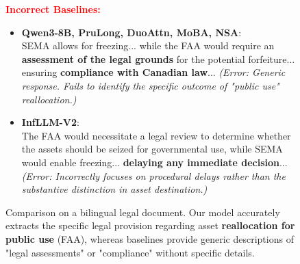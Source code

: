 \begin{figure}[ht]
\begin{AcademicBox}
\textbf{\textcolor{red}{Incorrect Baselines:}} \\
\footnotesize
\begin{itemize}[leftmargin=*, label={}, itemsep=4pt, topsep=2pt]

    \item \textbf{Qwen3-8B, PruLong, DuoAttn, MoBA, NSA}: \\
    SEMA allows for freezing... while the FAA would require an \textbf{assessment of the legal grounds} for the potential forfeiture... ensuring \textbf{compliance with Canadian law}...
    \textit{(Error: Generic response. Fails to identify the specific outcome of "public use" reallocation.)}

    \item \textbf{InfLLM-V2}: \\
    The FAA would necessitate a legal review to determine whether the assets should be seized for governmental use, while SEMA would enable freezing... \textbf{delaying any immediate decision}...
    \textit{(Error: Incorrectly focuses on procedural delays rather than the substantive distinction in asset destination.)}

\end{itemize}

\end{AcademicBox}
\caption{Comparison on a bilingual legal document. Our model accurately extracts the specific legal provision regarding asset \textbf{reallocation for public use} (FAA), whereas baselines provide generic descriptions of "legal assessments" or "compliance" without specific details.}
\label{fig:case_legal}
\end{figure}